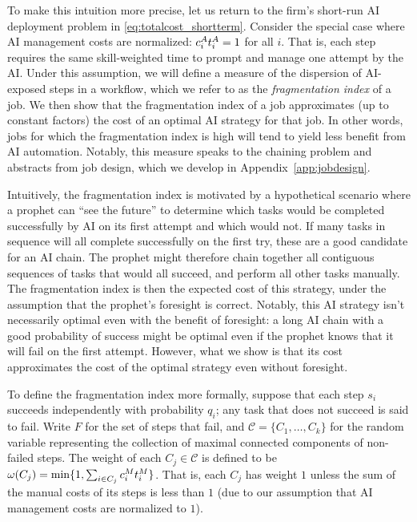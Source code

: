 To make this intuition more precise, let us return to the firm's short-run AI deployment problem in \eqref{eq:totalcost_shortterm}.
Consider the special case where AI management costs are normalized: $c^{A}_{i}t^{A}_{i} = 1$ for all $i$.
That is, each step requires the same skill-weighted time to prompt and manage one attempt by the AI.
Under this assumption, we will define a measure of the dispersion of AI-exposed steps in a workflow, which we refer to as the \emph{fragmentation index} of a job.
We then show that the fragmentation index of a job approximates (up to constant factors) the cost of an optimal AI strategy for that job.
In other words, jobs for which the fragmentation index is high will tend to yield less benefit from AI automation.
Notably, this measure speaks to the chaining problem and abstracts from job design, which we develop in Appendix~\ref{app:jobdesign}.

Intuitively, the fragmentation index is motivated by a hypothetical scenario where a prophet can ``see the future'' to determine which tasks would be completed successfully by AI on its first attempt and which would not.
If many tasks in sequence will all complete successfully on the first try, these are a good candidate for an AI chain.
The prophet might therefore chain together all contiguous sequences of tasks that would all succeed, and perform all other tasks manually.
The fragmentation index is then the expected cost of this strategy, under the assumption that the prophet's foresight is correct.
Notably, this AI strategy isn't necessarily optimal even with the benefit of foresight: a long AI chain with a good probability of success might be optimal even if the prophet knows that it will fail on the first attempt.
However, what we show is that its cost approximates the cost of the optimal strategy even without foresight.

To define the fragmentation index more formally, suppose that each step $s_i$ succeeds independently with probability $q_i$; any task that does not succeed is said to fail.
Write $F$ for the set of steps that fail, and $\mathcal{C} = \{C_1, \dotsc, C_k\}$ for the random variable representing the collection of maximal connected components of non-failed steps.
The weight of each $C_j \in \mathcal{C}$ is defined to be $\omega(C_j) = \min\{ 1, \sum_{i \in C_j} c^{M}_{i}t^{M}_{i} \}$.
That is, each $C_j$ has weight $1$ unless the sum of the manual costs of its steps is less than $1$ (due to our assumption that AI management costs are normalized to $1$).

